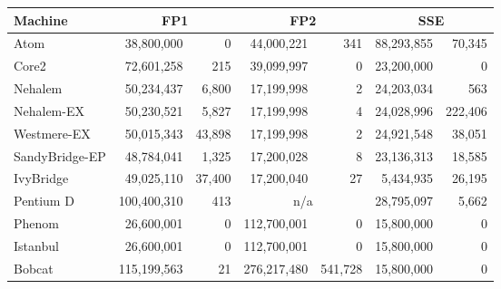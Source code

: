 
\begin{tabular}{|l||r@{$\pm$}r|r@{$\pm$}r|r@{$\pm$}r|}

\hline
Machine   & 
\multicolumn{2}{c|}{FP1} & 
\multicolumn{2}{c|}{FP2} & 
\multicolumn{2}{c|}{SSE} \\
\hline
\hline

Atom         &  38,800,000 &   0 & 44,000,221 & 341 & 88,293,855 & 70,345 \\
\hline
Core2        &  72,601,258 & 215 &  39,099,997 & 0 & 23,200,000 & 0   \\
\hline
Nehalem      &  50,234,437 & 6,800 &  17,199,998 & 2 & 24,203,034 & 563 \\
\hline
Nehalem-EX   &  50,230,521 & 5,827 &  17,199,998 & 4 & 24,028,996 & 222,406 \\
\hline
Westmere-EX  &  50,015,343 & 43,898 & 17,199,998 & 2  & 24,921,548 & 38,051 \\
\hline
SandyBridge-EP &  48,784,041 & 1,325 &  17,200,028 & 8 & 23,136,313 & 18,585 \\
\hline
IvyBridge    &  49,025,110 & 37,400 & 17,200,040 & 27 &  5,434,935 & 26,195  \\
\hline
Pentium D    & 100,400,310 & 413 & \multicolumn{2}{c|}{n/a} & 28,795,097 & 5,662\\
\hline
Phenom       & 26,600,001 & 0  & 112,700,001 & 0 &  15,800,000 & 0\\
\hline
Istanbul     & 26,600,001 & 0  & 112,700,001 & 0 & 15,800,000 & 0 \\
\hline
Bobcat       & 115,199,563 & 21  & 276,217,480 & 541,728 & 15,800,000 & 0 \\
\hline
\end{tabular}
%

